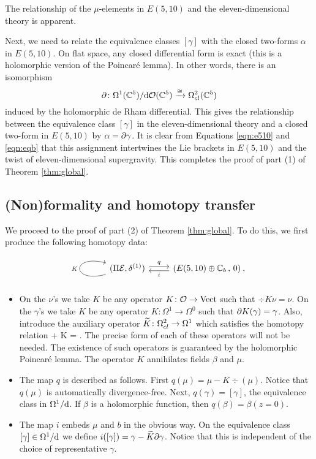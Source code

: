 The relationship of the $\mu$-elements in $E(5,10)$ and the eleven-dimensional theory is apparent.

Next, we need to relate the equivalence classes $[\gamma]$ with the closed two-forms $\alpha$ in $E(5,10)$. 
On flat space, any closed differential form is exact (this is a holomorphic version of the Poincar\'e lemma). 
In other words, there is an isomorphism
\[
\partial \colon \Omega^1 (\mathbb C^5) / {\rm d} \mathcal O(\mathbb C^5) \xrightarrow{\cong} \Omega^{2}_{cl}(\mathbb C^5)
\]
induced by the holomorphic de Rham differential.
This gives the relationship between the equivalence class $[\gamma]$ in the eleven-dimensional theory and a closed two-form in $E(5,10)$ by $\alpha = \partial \gamma$. 
It is clear from Equations \eqref{eqn:e510} and \eqref{eqn:eqb} that this assignment intertwines the Lie brackets in $E(5,10)$ and the twist of eleven-dimensional supergravity. 
This completes the proof of part (1) of Theorem \ref{thm:global}.

\subsection{(Non)formality and homotopy transfer} 
\label{s:ht}
We proceed to the proof of part (2) of Theorem \ref{thm:global}. 
To do this, we first produce the following homotopy data:
\begin{equation}
\begin{tikzcd}
\arrow[loop left]{l}{K}(\Pi \cE , \delta^{(1)})\arrow[r, shift left, "q"] &(E(5,10) \oplus \CC_b \, , \, 0)\arrow[l, shift left, "i"] \: ,
\end{tikzcd}
\end{equation}

\begin{itemize}
\item On the $\nu$'s we take $K$ be any operator $K \colon \mathcal O \to {\rm Vect}$ such that $\div K \nu = \nu$. 
On the $\gamma$'s we take $K$ be any operator $K \colon \Omega^1 \to \Omega^0$ such that $\partial K(\gamma) = \gamma$. 
Also, introduce the auxiliary operator $\widetilde{K} \colon \Omega^2_{cl} \to \Omega^1$ which satisfies the homotopy relation
\beqn\label{eqn:htpy1}
 \del \gamma + \del K \gamma = \gamma . 
\eeqn
The precise form of each of these operators will not be needed.
The existence of such operators is guaranteed by the holomorphic Poincar\'e lemma.
The operator $K$ annihilates fields $\beta$ and $\mu$. 
\item 
The map $q$ is described as follows. 
First $q(\mu) = \mu - K \div (\mu)$.
Notice that $q(\mu)$ is automatically divergence-free.
Next, $q(\gamma) = [\gamma]$, the equivalence class in $\Omega^1 / {\rm d}$. 
If $\beta$ is a holomorphic function, then $q(\beta) = \beta (z=0)$.
\item 
The map $i$ embeds $\mu$ and $b$ in the obvious way.
On the equivalence class $[\gamma] \in \Omega^1 / {\rm d}$ we define $i([\gamma]) = \gamma - \widetilde{K} \partial \gamma$. 
Notice that this is independent of the choice of representative $\gamma$. 
\end{itemize}

